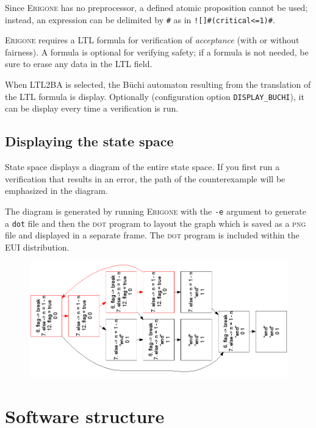 \documentclass[11pt]{article}
\newcommand{\eri}{\textsc{Erigone}}
\newcommand{\eui}{\textsc{EUI}}
\newcommand{\p}[1]{\texttt{#1}}
\newcommand{\bu}[1]{\textsf{#1}}
\begin{document}
Since \eri{} has no preprocessor, a defined atomic proposition cannot
be used; instead, an expression can be delimited by \verb+#+ as in
\verb+![]#(critical<=1)#+.

\eri{} requires a LTL formula for verification of \emph{acceptance}
(with or without fairness). A formula is optional for verifying safety;
if a formula is not needed, be sure to erase any data in the LTL field.

When \bu{LTL2BA} is selected, the B\"{u}chi automaton resulting from the
translation of the LTL formula is display. Optionally (configuration
option \p{DISPLAY\_BUCHI}), it can be display every time a verification
is run.

\subsection{Displaying the state space}\label{s.space}

\bu{State space} displays a diagram of the entire state space. If you
first run a verification that results in an error, the path of the
counterexample will be emphasized in the diagram.

The diagram is generated by running \eri{} with the \p{-e} argument to
generate a \texttt{dot} file and then the \textsc{dot} program to layout
the graph which is saved as a \textsc{png} file and displayed in a
separate frame. The \textsc{dot} program is included within the \eui{}
distribution.

\bigskip

\begin{figure}[hbt]
\begin{center}
\includegraphics[width=\textwidth,keepaspectratio=true]{fair}
\end{center}
\end{figure}

\newpage

\section{Software structure}
\end{document}
